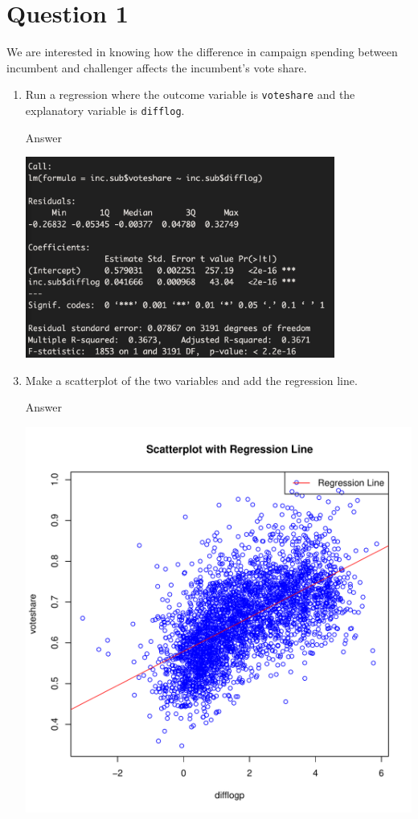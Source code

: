 \documentclass[12pt,letterpaper]{article}
\begin{document}
\section*{Question 1}
\vspace{.25cm}
\noindent We are interested in knowing how the difference in campaign spending between incumbent and challenger affects the incumbent's vote share. 
	\begin{enumerate}
		\item Run a regression where the outcome variable is \texttt{voteshare} and the explanatory variable is \texttt{difflog}.
		\item [Answer]
		 
	  	\includegraphics[width=0.8\textwidth]{q1.png}
		\vspace{5cm}
		\item Make a scatterplot of the two variables and add the regression line. 	
		\item [Answer]
		 
		\includegraphics[width=.85\textwidth]{lm_vote_diff.pdf}

\end{enumerate}
\end{document}
